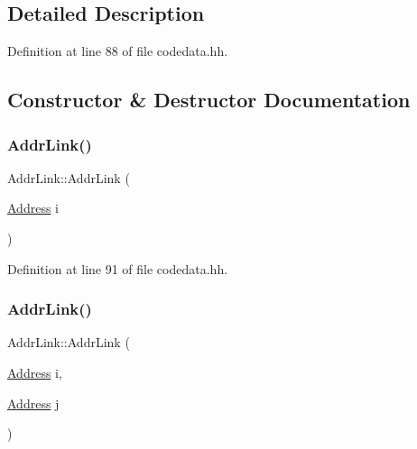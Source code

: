 \subsection{Detailed Description}


Definition at line 88 of file codedata.\+hh.



\subsection{Constructor \& Destructor Documentation}
\mbox{\label{struct_addr_link_a801a20cc2cf34031ff767da3f343cea7}} 
\subsubsection{\texorpdfstring{AddrLink()}{AddrLink()}\hspace{0.1cm}{\footnotesize\ttfamily [1/2]}}
{\footnotesize\ttfamily Addr\+Link\+::\+Addr\+Link (\begin{DoxyParamCaption}\item[{\mbox{\hyperlink{class_address}{Address}}}]{i }\end{DoxyParamCaption})\hspace{0.3cm}{\ttfamily [inline]}}



Definition at line 91 of file codedata.\+hh.

\mbox{\label{struct_addr_link_ad7f2849ca3127793e2c0f08e23721992}} 
\subsubsection{\texorpdfstring{AddrLink()}{AddrLink()}\hspace{0.1cm}{\footnotesize\ttfamily [2/2]}}
{\footnotesize\ttfamily Addr\+Link\+::\+Addr\+Link (\begin{DoxyParamCaption}\item[{\mbox{\hyperlink{class_address}{Address}}}]{i,  }\item[{\mbox{\hyperlink{class_address}{Address}}}]{j }\end{DoxyParamCaption})\hspace{0.3cm}{\ttfamily [inline]}}



